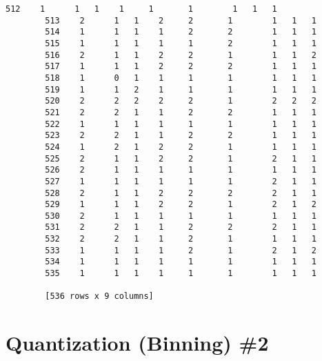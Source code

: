 \documentclass[11pt]{article}
\begin{document}
\begin{Verbatim}[commandchars=\\\{\}]
        512    1      1   1    1     1       1        1   1   1
        513    2      1   1    2     2       1        1   1   1
        514    1      1   1    1     2       2        1   1   1
        515    1      1   1    1     1       2        1   1   1
        516    2      1   1    2     2       1        1   1   2
        517    1      1   1    2     2       2        1   1   1
        518    1      0   1    1     1       1        1   1   1
        519    1      1   2    1     1       1        1   1   1
        520    2      2   2    2     2       1        2   2   2
        521    2      2   1    1     2       2        1   1   1
        522    1      1   1    1     1       1        1   1   1
        523    2      2   1    1     2       2        1   1   1
        524    1      2   1    2     2       1        1   1   1
        525    2      1   1    2     2       1        2   1   1
        526    2      1   1    1     1       1        1   1   1
        527    1      1   1    1     1       1        2   1   1
        528    2      1   1    2     2       2        2   1   1
        529    1      1   1    2     2       1        2   1   2
        530    2      1   1    1     1       1        1   1   1
        531    2      2   1    1     2       2        2   1   1
        532    2      2   1    1     2       1        1   1   1
        533    1      1   1    1     2       1        2   1   2
        534    1      1   1    1     1       1        1   1   1
        535    1      1   1    1     1       1        1   1   1
        
        [536 rows x 9 columns]
\end{Verbatim}
            
    \hypertarget{quantization-binning-2}{%
\section{Quantization (Binning) \#2}\label{quantization-binning-2}}
\end{document}
